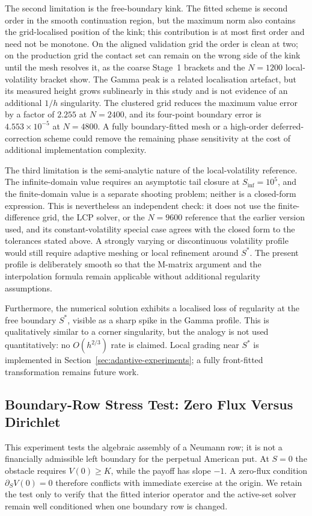 \documentclass[11pt,a4paper]{article}
\theoremstyle{definition}
\theoremstyle{remark}
\begin{document}
The second limitation is the free-boundary kink. The fitted scheme is second
order in the smooth continuation region, but the maximum norm also contains
the grid-localised position of the kink; this contribution is at most first
order and need not be monotone. On the aligned validation grid the order is
clean at two; on the production grid the contact set can remain on the wrong
side of the kink until the mesh resolves it, as the coarse Stage~1 brackets
and the $N=1200$ local-volatility bracket show. The Gamma peak is a related
localisation artefact, but its measured height grows sublinearly in this
study and is not evidence of an additional $1/h$ singularity.
The clustered grid reduces the maximum value error by a factor of $2.255$ at
$N=2400$, and its four-point boundary error is $4.553\times10^{-5}$ at
$N=4800$. A fully boundary-fitted mesh or a high-order deferred-correction
scheme \cite{ref6} could remove the remaining phase sensitivity at the cost of
additional implementation complexity.

The third limitation is the semi-analytic nature of the local-volatility
reference. The infinite-domain value requires an asymptotic tail closure at
$S_{\inf}=10^5$, and the finite-domain value is a separate shooting problem;
neither is a closed-form expression. This is nevertheless an independent
check: it does not use the finite-difference grid, the LCP solver, or the
$N=9600$ reference that the earlier version used, and its constant-volatility
special case agrees with the closed form to the tolerances stated above. A
strongly varying or discontinuous volatility profile would still require
adaptive meshing or local refinement around $S^*$. The present profile is
deliberately smooth so that the M-matrix argument and the interpolation
formula remain applicable without additional regularity assumptions.

Furthermore, the numerical solution exhibits a localised loss of regularity
at the free boundary $S^*$, visible as a sharp spike in the Gamma profile.
This is qualitatively similar to a corner singularity, but the analogy is not
used quantitatively: no $O(h^{2/3})$ rate is claimed. Local grading near
$S^*$ is implemented in Section~\ref{sec:adaptive-experiments}; a fully
front-fitted transformation remains future work.

\subsection{Boundary-Row Stress Test: Zero Flux Versus Dirichlet}
\label{sec:mixed-boundary}
This experiment tests the algebraic assembly of a Neumann row; it is not a
financially admissible left boundary for the perpetual American put. At
\(S=0\) the obstacle requires \(V(0)\ge K\), while the payoff has slope
\(-1\). A zero-flux condition \(\partial_SV(0)=0\) therefore conflicts with
immediate exercise at the origin. We retain the test only to verify that the
fitted interior operator and the active-set solver remain well conditioned
when one boundary row is changed.
\end{document}
